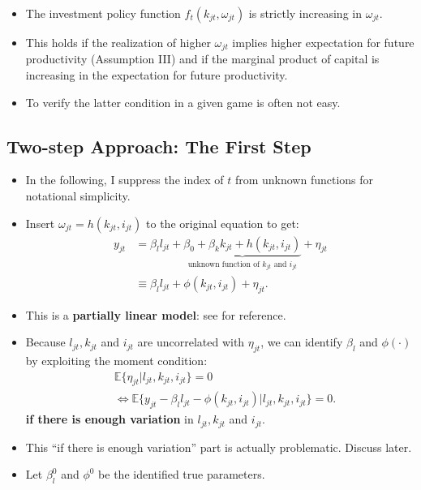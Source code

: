 \documentclass[
]{book}
\providecommand{\tightlist}{%
  \setlength{\itemsep}{0pt}\setlength{\parskip}{0pt}}
\begin{document}
\begin{itemize}
\tightlist
\item
  The investment policy function \(f_t(k_{jt}, \omega_{jt})\) is strictly increasing in \(\omega_{jt}\).
\item
  This holds if the realization of higher \(\omega_{jt}\) implies higher expectation for future productivity (Assumption III) and if the marginal product of capital is increasing in the expectation for future productivity.
\item
  To verify the latter condition in a given game is often not easy.
\end{itemize}

\hypertarget{two-step-approach-the-first-step}{%
\subsection{Two-step Approach: The First Step}\label{two-step-approach-the-first-step}}

\begin{itemize}
\tightlist
\item
  In the following, I suppress the index of \(t\) from unknown functions for notational simplicity.
\item
  Insert \(\omega_{jt} = h(k_{jt}, i_{jt})\) to the original equation to get:
  \begin{equation}
  \begin{split}
  y_{jt} &= \beta_l l_{jt} + \underbrace{\beta_0 + \beta_k k_{jt} + h(k_{jt}, i_{jt})}_{\text{unknown function of $k_{jt}$ and $i_{jt}$}} + \eta_{jt}\\
  & \equiv \beta_l l_{jt} + \phi(k_{jt}, i_{jt}) + \eta_{jt}.
  \end{split}
  \end{equation}
\item
  This is a \textbf{partially linear model}: see \citet{Ichimura2007} for reference.
\item
  Because \(l_{jt}, k_{jt}\) and \(i_{jt}\) are uncorrelated with \(\eta_{jt}\), we can identify \(\beta_l\) and \(\phi(\cdot)\) by exploiting the moment condition:
  \begin{equation}
  \begin{split}
  & \mathbb{E}\{\eta_{jt}|l_{jt}, k_{jt}, i_{jt}\} = 0\\
  & \Leftrightarrow \mathbb{E}\{y_{jt} - \beta_l l_{jt} - \phi(k_{jt}, i_{jt}) |l_{jt}, k_{jt}, i_{jt}\} = 0.
  \end{split}
  \end{equation}
  \textbf{if there is enough variation} in \(l_{jt}, k_{jt}\) and \(i_{jt}\).
\item
  This ``if there is enough variation'' part is actually problematic. Discuss later.
\item
  Let \(\beta_l^0\) and \(\phi^0\) be the identified true parameters.
\end{itemize}
\end{document}
